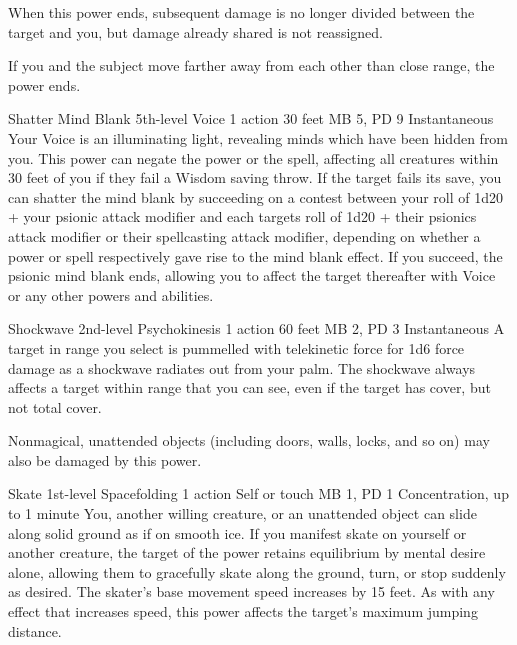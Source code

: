   When this power ends,
  subsequent damage is no longer divided between the target and you,
  but damage already shared is not reassigned.

  If you and the subject move farther away from each other
  than close range, the power ends.

\DndPowerHeader%
  {Shatter Mind Blank}
  {5th-level Voice}
  {1 action}
  {30 feet}
  {MB 5, PD 9}
  {Instantaneous}
  Your Voice is an illuminating light,
  revealing minds which have been hidden from you.
  This power can negate the  power
  or the  spell,
  affecting all creatures within 30 feet of you
  if they fail a Wisdom saving throw.
  If the target fails its save,
  you can shatter the mind blank by succeeding on a
  contest between your roll of
  1d20 + your psionic attack modifier
  and each targets roll of 
  1d20 + their psionics attack modifier or
  their spellcasting attack modifier,
  depending on whether a power or spell respectively
  gave rise to the mind blank effect.
  If you succeed,
  the psionic mind blank ends,
  allowing you to affect the target thereafter
  with Voice or any other powers and abilities.

\DndPowerHeader%
  {Shockwave}
  {2nd-level Psychokinesis}
  {1 action}
  {60 feet}
  {MB 2, PD 3}
  {Instantaneous}
A target in range you select is pummelled with telekinetic force
for 1d6 force damage as a shockwave radiates out from your palm.
The shockwave always affects a target within range that you can see,
even if the target has cover, but not total cover.

Nonmagical, unattended objects
(including doors, walls, locks, and so on)
may also be damaged by this power.

\DndPowerHeader%
  {Skate}
  {1st-level Spacefolding}
  {1 action}
  {Self or touch}
  {MB 1, PD 1}
  {Concentration, up to 1 minute}
  You, another willing creature, or an unattended object
  can slide along solid ground as if on smooth ice.
  If you manifest skate on yourself or another creature,
  the target of the power retains equilibrium by mental desire alone,
  allowing them to gracefully skate along the ground,
  turn, or stop suddenly as desired.
  The skater's base movement speed increases by 15 feet.
  As with any effect that increases speed,
  this power affects the target's maximum jumping distance.

